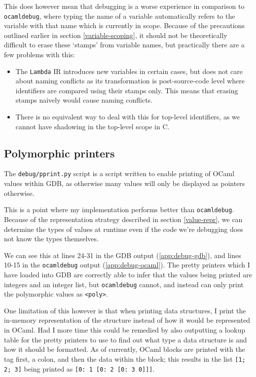 \documentclass[12pt,a4paper,twoside,openright]{report}
\begin{document}
This does however mean that debugging is a worse experience in comparison to 
\texttt{ocamldebug}, where typing the name of a variable automatically refers 
to the variable with that name which is currently in scope. Because of the 
precautions outlined earlier in section \ref{variable-scoping}, it should not 
be theoretically difficult to erase these `stamps' from variable names, but 
practically there are a few problems with this:

\begin{itemize}
    \item The \texttt{Lambda} IR introduces new variables in certain cases, but 
    does not care about naming conflicts as its transformation is 
    post-source-code level where identifiers are compared using their stamps 
    only. This means that erasing stamps naively would cause naming conflicts.
    \item There is no equivalent way to deal with this for top-level 
    identifiers, as we cannot have shadowing in the top-level scope in C.
\end{itemize}

\subsection{Polymorphic printers}

The \texttt{debug/pprint.py} script is a script written to enable printing of 
OCaml values within GDB, as otherwise many values will only be displayed as 
pointers otherwise.

This is a point where my implementation performs better than 
\texttt{ocamldebug}. Because of the representation strategy described in section
\ref{value-repr}, we can determine the types of values at runtime even if the 
code we're debugging does not know the types themselves.

We can see this at lines 24-31 in the GDB output (\ref{app:debug-gdb}), and 
lines 10-15 in the \texttt{ocamldebug} output (\ref{app:debug-ocaml}). The 
pretty printers which I have loaded into GDB are correctly able to infer that 
the values being printed are integers and an integer list, but 
\texttt{ocamldebug} cannot, and instead can only print the polymorphic values 
as \texttt{<poly>}.

One limitation of this however is that when printing data structures, I print 
the in-memory representation of the structure instead of how it would be 
represented in OCaml. Had I more time this could be remedied by also outputting 
a lookup table for the pretty printers to use to find out what type a data 
structure is and how it should be formatted. As of currently, OCaml blocks are 
printed with the tag first, a colon, and then the data within the block; this 
results in the list \texttt{[1; 2; 3]} being printed as \texttt{[0: 1 [0: 2 [0: 
3 0]]]}.
\end{document}
